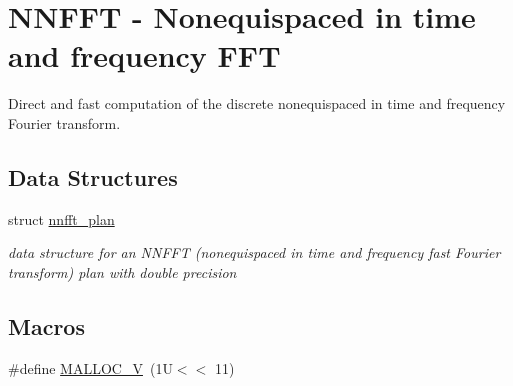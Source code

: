 \hypertarget{group__nnfft}{\section{N\-N\-F\-F\-T -\/ Nonequispaced in time and frequency F\-F\-T}
\label{group__nnfft}
}


Direct and fast computation of the discrete nonequispaced in time and frequency Fourier transform.  


\subsection*{Data Structures}
\begin{DoxyCompactItemize}
\item 
struct \hyperlink{structnnfft__plan}{nnfft\-\_\-plan}
\begin{DoxyCompactList}\small\item\em data structure for an N\-N\-F\-F\-T (nonequispaced in time and frequency fast Fourier transform) plan with double precision \end{DoxyCompactList}\end{DoxyCompactItemize}
\subsection*{Macros}
\begin{DoxyCompactItemize}
\item 
\#define \hyperlink{group__nnfft_gabfc80597fb6dcd28f3b9728bd7082642}{M\-A\-L\-L\-O\-C\-\_\-\-V}~(1\-U$<$$<$ 11)
\end{DoxyCompactItemize}
